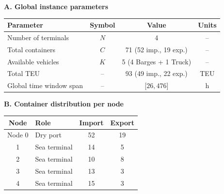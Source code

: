 \begin{table}[htbp]
\centering

\textbf{A. Global instance parameters}

\vspace{0.3em}

\begin{tabular}{l c c c}
\hline
Parameter & Symbol & Value & Units \\
\hline
Number of terminals & $N$ & 4 & -- \\
Total containers & $C$ & 71 (52 imp., 19 exp.) & -- \\
Available vehicles & $K$ & 5 (4 Barges + 1 Truck) & -- \\
Total TEU & -- & 93 (49 imp., 22 exp.) & TEU \\
Global time window span & -- & [$26, 476$] & h \\
\hline
\end{tabular}

\vspace{0.8em}

\textbf{B. Container distribution per node}

\vspace{0.3em}

\begin{tabular}{c l c c}
\hline
Node & Role & Import & Export \\
\hline
Node 0 & Dry port & 52 & 19 \\
1 & Sea terminal & 14 & 5 \\
2 & Sea terminal & 10 & 8 \\
3 & Sea terminal & 13 & 3 \\
4 & Sea terminal & 15 & 3 \\
\hline
\end{tabular}

\end{table}
